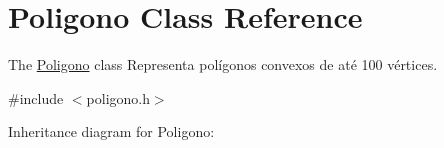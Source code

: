 \hypertarget{class_poligono}{}\section{Poligono Class Reference}
\label{class_poligono}


The \hyperlink{class_poligono}{Poligono} class Representa polígonos convexos de até 100 vértices.  




{\ttfamily \#include $<$poligono.\+h$>$}



Inheritance diagram for Poligono\+:
